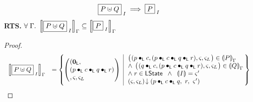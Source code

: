 %
%
\begin{lemma}
%
\[
	\shared{P \sepish Q}{I} \implies \shared{P}{I}
\]
%
\textbf{RTS.} $\for{\lenv} \sem[\lenv]{\shared{P \sepish Q}{I}} \subseteq  \sem[\lenv]{\shared{P}{I}}$
%
\begin{proof}
\[
\begin{array}{r l}
	\sem[\lenv]{\shared{P \sepish Q}{I}} &
	= \left\{
	\hspace*{-0.2cm}
	\begin{array}{l | l}
		\left(
		\hspace*{-0.15cm}
		\begin{array}{l}
		(\unitL, \\
		(p \composeL c \composeL q \composeL r)\\
		, \amod{}, \amod{L}
		\end{array}
		\hspace*{-0.15cm}
		\right)
		&
		\hspace*{-0.1cm}
		\begin{array}{l}
			\left(
			\hspace*{-0.15cm}
			\begin{array}{l}
			(p \composeL c, 
			(p \composeL c \composeL q \composeL r)
			, \amod{}, \amod{L}
			\end{array}
			\hspace*{-0.15cm}
			\right) \in \intermediateSem[\lenv]{P}\\
			
			\land\; \left(
			\hspace*{-0.15cm}
			\begin{array}{l}
			(q \composeL c, 
			(p \composeL c \composeL q \composeL r)
			, \amod{}, \amod{L}
			\end{array}
			\hspace*{-0.15cm}
			\right) \in \intermediateSem[\lenv]{Q}\\
			
			\land\; r \in \LState \;\;\land\;\; \intermediateSemI{I} = \amod{}'\\
			
			\extendsAM{\amod{}, \amod{L}}{p \composeL c \composeL q}{\ r}{\ \amod{}'}
		\end{array}
		\hspace*{-0.1cm}
	\end{array}
	\hspace*{-0.2cm}
	\right\} \\
	
	
	

\end{array}\]
\end{proof}
\end{lemma}
